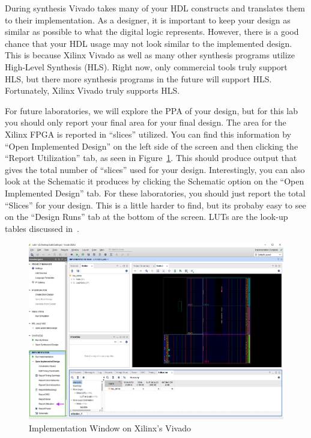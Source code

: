 \documentclass{article}
\begin{document}
During synthesis Vivado takes many of your HDL constructs and
translates them to their implementation.  As a designer, it is
important to keep your design as similar as possible to what the
digital logic represents.  However, there is a good chance that your
HDL usage may not look similar to the implemented design.  This is
because Xilinx Vivado
as well as many other synthesis programs utilize High-Level Synthesis
(HLS).  Right now, only commercial tools truly support HLS, but there
more synthesis programs in the future will support HLS.  Fortunately,
Xilinx Vivado truly supports HLS.

For future laboratories, we will explore the PPA of your design, but
for this lab you should only report your final area for your final design.
The area for the Xilinx FPGA is reported in 
``slices'' utilized.  You can find this information by ``Open
Implemented Design'' on the left side of the screen and then clicking
the ``Report Utilization'' tab, as seen in
Figure~\ref{utilization.fig}.    
This should produce output that
gives the total number of ``slices'' used for your design.
Interestingly, you can also look at the Schematic it produces by
clicking the Schematic option on the ``Open Implemented Design'' tab.
For these laboratories, you should just report the total ``Slices''
for your design.  This is a little harder to find, but its probaby
easy to see on the ``Design Runs'' tab at the bottom of the screen.
LUTs are the look-up tables discussed in~\cite{7086413}.
\begin{figure}
  \centering
  \includegraphics[scale=0.2]{Utilization.png}
  \caption{Implementation Window on Xilinx's Vivado}
  \label{utilization.fig}
\end{figure}
\end{document}
